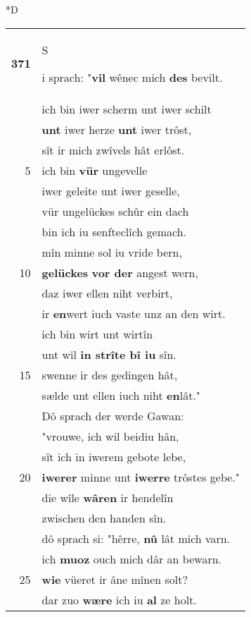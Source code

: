 \documentclass[8pt,a4paper,notitlepage]{article}
\begin{document}
\begin{table}[ht]
\begin{minipage}[t]{0.5\linewidth}
\small
\begin{center}*D
\end{center}
\begin{tabular}{rl}
\textbf{371} & \begin{large}S\end{large}i sprach: "\textbf{vil} wênec mich \textbf{des} bevilt.\\ 
 & ich bin iwer scherm unt iwer schilt\\ 
 & \textbf{unt} iwer herze \textbf{unt} iwer trôst,\\ 
 & sît ir mich zwîvels hât erlôst.\\ 
5 & ich bin \textbf{vür} ungevelle\\ 
 & iwer geleite unt iwer geselle,\\ 
 & vür ungelückes schûr ein dach\\ 
 & bin ich iu senfteclîch gemach.\\ 
 & mîn minne sol iu vride bern,\\ 
10 & \textbf{gelückes} \textbf{vor der} angest wern,\\ 
 & daz iwer ellen niht verbirt,\\ 
 & ir \textbf{en}wert iuch vaste unz an den wirt.\\ 
 & ich bin wirt unt wirtîn\\ 
 & unt wil \textbf{in strîte bî iu} sîn.\\ 
15 & swenne ir des gedingen hât,\\ 
 & sælde unt ellen iuch niht \textbf{en}lât."\\ 
 & Dô sprach der werde Gawan:\\ 
 & "vrouwe, ich wil beidiu hân,\\ 
 & sît ich in iwerem gebote lebe,\\ 
20 & \textbf{iwerer} minne unt \textbf{iwerre} trôstes gebe."\\ 
 & die wîle \textbf{wâren} ir hendelîn\\ 
 & zwischen den handen sîn.\\ 
 & dô sprach si: "hêrre, \textbf{nû} lât mich varn.\\ 
 & ich \textbf{muoz} ouch mich dâr an bewarn.\\ 
25 & \textbf{wie} vüeret ir âne mînen solt?\\ 
 & dar zuo \textbf{wære} ich iu \textbf{al} ze holt.\\ 

\end{tabular}
\end{minipage}
\end{table}
\end{document}
